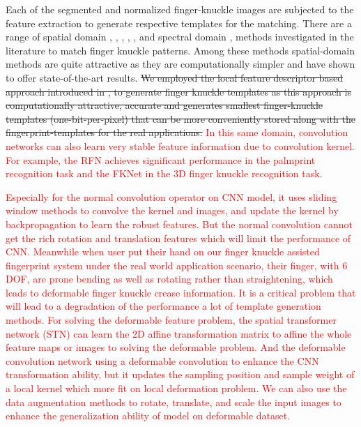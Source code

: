 Each of the segmented and normalized finger-knuckle images are subjected to the feature extraction to generate respective templates for the matching. There are a range of spatial domain \cite{sricharan2006knuckle}, \cite{kumar2009personal}, \cite{zhang2010online}, \cite{zhu2010multimodal}, \cite{zheng20163d}, \cite{kumar2016personal} and spectral domain \cite{aoyama2011finger}, \cite{kumar2015recovering} methods investigated in the literature to match finger knuckle patterns. Among these methods spatial-domain methods are quite attractive as they are computationally simpler and have shown to offer state-of-the-art results. \sout{We employed the local feature descriptor based approach introduced in \cite{zheng20163d}, \cite{kumar2016personal} to generate finger knuckle templates as this approach is computationally attractive, accurate and generates smallest finger-knuckle templates (one-bit-per-pixel) that can be more conveniently stored along with the fingerprint-templates for the real applications.} \textcolor{red}{In this same domain, convolution networks can also learn very stable feature information due to convolution kernel. For example, the RFN \cite{liu2020contactless} achieves significant performance in the palmprint recognition task and the FKNet \cite{cheng2020deep} in the 3D finger knuckle recognition task.}

\textcolor{red}{Especially for the normal convolution operator on CNN model, it uses sliding window methods to convolve the kernel and images, and update the kernel by backpropagation to learn the robust features. But the normal convolution cannot get the rich rotation and translation features which will limit the performance of CNN. Meanwhile when user put their hand on our finger knuckle assisted fingerprint system under the real world application scenario, their finger, with 6 DOF, are prone bending as well as rotating rather than straightening, which leads to deformable finger knuckle crease information. It is a critical problem that will lead to a degradation of the performance a lot of template generation methods. For solving the deformable feature problem, the spatial transformer network (STN) \cite{jaderberg2015spatial} can learn the 2D affine transformation matrix to affine the whole feature maps or images to solving the deformable problem. And the deformable convolution network \cite{zhu2019deformable} using a deformable convolution to enhance the CNN transformation ability, but it updates the sampling position and sample weight of a local kernel which more fit on local deformation problem. We can also use the data augmentation methods to rotate, translate, and scale the input images to enhance the generalization ability of model on deformable dataset.}

